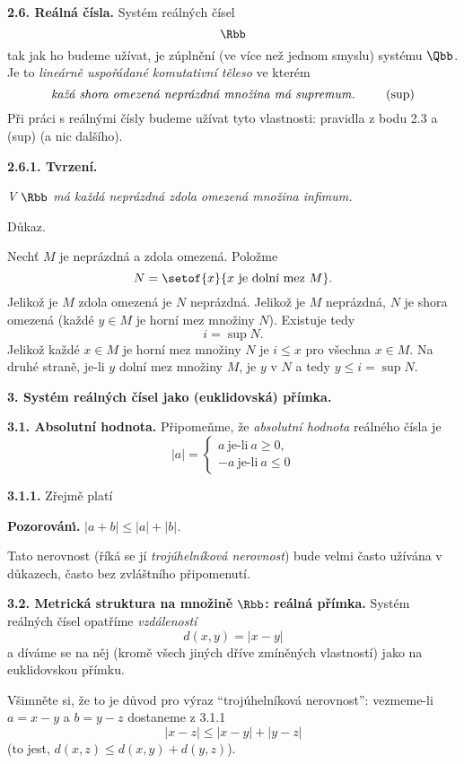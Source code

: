 \documentclass[12pt]{article}
\begin{document}
\bigskip

{\bf 2.6. Reálná čísla.} Systém reálných čísel
$$
\Rbb
$$
tak jak ho budeme užívat, je zúplnění (ve více než jednom smyslu) systému  $\Qbb$. Je to {\em lineárně uspořádané komutativní těleso} ve kterém
\begin{equation}
\text{\em kažá shora omezená neprázdná množina má supremum. }\tag{sup}
\end{equation}
Při práci s reálnými čísly budeme užívat tyto vlastnosti: pravidla z bodu 2.3 a (sup) (a nic dalšího).

\medskip

{\bf 2.6.1. Tvrzení.} {\em V $\Rbb$ má každá neprázdná zdola omezená množina infimum.

Důkaz.}  Nechť $M$ je neprázdná a zdola omezená. Položme
$$
N=\setof{x}{x\ \text{je doln\'\i\ mez}\ M}.
$$
Jelikož je $M$ zdola omezená je $N$ neprázdná. Jelikož je $M$ neprázdná, $N$ je shora omezená (každé $y\in M$ je horní mez množiny $N$). Existuje tedy
$$
i=\sup N.
$$
Jelikož každé $x\in M$ je horní mez množiny $N$ je $i\leq x$ pro všechna $x\in M$. Na druhé straně, je-li $y$ dolní mez množiny $M$, je $y$ v $N$ a tedy $y\leq i=\sup N$. \sq

\vskip10mm

{\bf\large 3. Systém reálných čísel jako  (euklidovská) přímka.}

\bigskip

{\bf 3.1. Absolutní hodnota.} Připomeňme, že {\em absolutní hodnota} reálného čísla je
$$
|a|=\begin{cases} a\ \text{je-li}\ a\geq 0,\\
                  -a\ \text{je-li}\ a\leq 0
\end{cases}
$$ 

\medskip

{\bf 3.1.1.} Zřejmě platí

\smallskip

{\bf Pozorov\'an\'\i.} {\em $|a+b|\leq |a|+|b|$.}

Tato nerovnost (říká se jí {\em trojúhelníková nerovnost}) bude velmi často užívána v důkazech, často bez zvláštního připomenutí.

\bigskip

{\bf 3.2. Metrická struktura na množině $\Rbb$: reálná přímka.} Systém reálných čísel opatříme  {\em vzdáleností}
$$
d(x,y)=|x-y|
$$
a díváme se na něj (kromě všech jiných dříve zmíněných vlastností) jako na euklidovskou přímku.

Všimněte si, že to je důvod pro výraz ``trojúhelníková nerovnost'':
vezmeme-li $a=x-y$ a $b=y-z$ dostaneme z 3.1.1
$$
|x-z|\leq |x-y|+|y-z|
$$
(to jest, $d(x,z)\leq d(x,y)+d(y,z)$).
\end{document}
